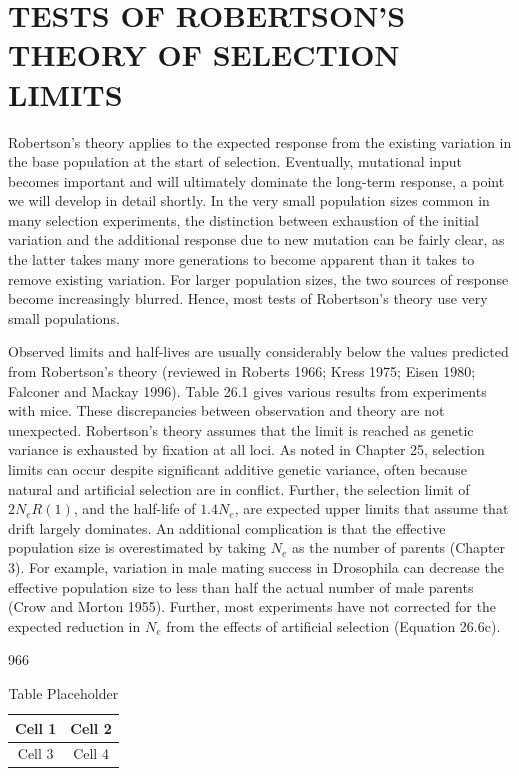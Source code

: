 \documentclass{article}
\begin{document}
\section{TESTS OF ROBERTSON'S THEORY OF SELECTION LIMITS}
Robertson's theory applies to the expected response from the existing variation in the base population at the start of selection. Eventually, mutational input becomes important and will ultimately dominate the long-term response, a point we will develop in detail shortly. In the very small population sizes common in many selection experiments, the distinction between exhaustion of the initial variation and the additional response due to new mutation can be fairly clear, as the latter takes many more generations to become apparent than it takes to remove existing variation. For larger population sizes, the two sources of response become increasingly blurred. Hence, most tests of Robertson's theory use very small populations.

Observed limits and half-lives are usually considerably below the values predicted from Robertson's theory (reviewed in Roberts 1966; Kress 1975; Eisen 1980; Falconer and Mackay 1996). Table 26.1 gives various results from experiments with mice. These discrepancies between observation and theory are not unexpected. Robertson's theory assumes that the limit is reached as genetic variance is exhausted by fixation at all loci. As noted in Chapter 25, selection limits can occur despite significant additive genetic variance, often because natural and artificial selection are in conflict. Further, the selection limit of  $ 2N_eR(1) $, and the half-life of  $ 1.4N_e $, are expected upper limits that assume that drift largely dominates. An additional complication is that the effective population size is overestimated by taking  $ N_e $ as the number of parents (Chapter 3). For example, variation in male mating success in Drosophila can decrease the effective population size to less than half the actual number of male parents (Crow and Morton 1955). Further, most experiments have not corrected for the expected reduction in  $ N_e $ from the effects of artificial selection (Equation 26.6c).

966

\begin{table}[h]
\centering
\begin{tabular}{|c|c|}
\hline
Cell 1 & Cell 2 \\
\hline
Cell 3 & Cell 4 \\
\hline
\end{tabular}
\caption{Table Placeholder}
\end{table}
\end{document}
